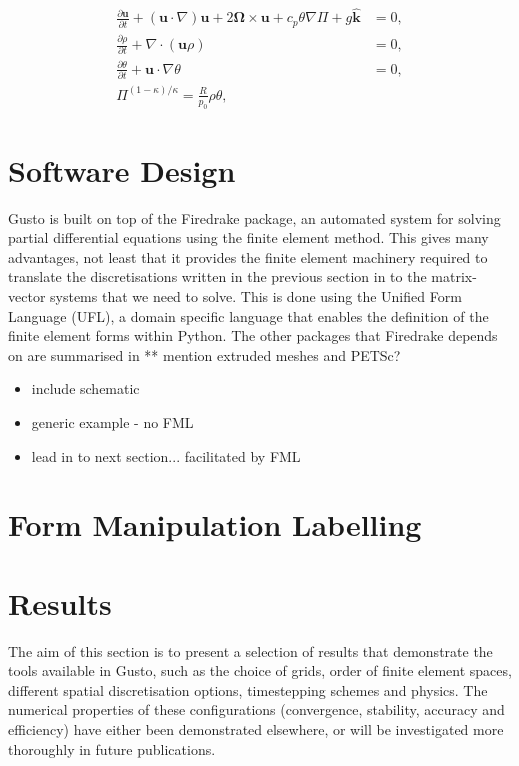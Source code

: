 \documentclass[11pt, a4paper]{article}
\def\MM#1{\boldsymbol{#1}}
\newcommand{\pp}[2]{\frac{\partial #1}{\partial #2}}
\begin{document}
\begin{align}
  \pp{\MM{u}}{t} + 
  (\MM{u}\cdot\nabla)\MM{u} +
  2\MM{\Omega}\times \MM{u} + c_p\theta\nabla \Pi + g\hat{\MM{k}} & = 0, \\
  \pp{\rho}{t} + \nabla\cdot(\MM{u}\rho) & = 0, \\
  \pp{\theta}{t} + \MM{u}\cdot\nabla\theta & = 0, \\
  \Pi^{(1-\kappa)/\kappa} = \frac{R}{p_0}\rho\theta, & 
\end{align}

\subsection{}

\section{Software Design}
\label{sec: design}
Gusto is built on top of the Firedrake package, an automated system
for solving partial differential equations using the finite element
method. This gives many advantages, not least that it provides the
finite element machinery required to translate the discretisations
written in the previous section in to the matrix-vector systems that
we need to solve. This is done using the Unified Form Language (UFL),
a domain specific language that enables the definition of the finite
element forms within Python. The other packages that Firedrake depends
on are summarised in \citet{davies2022towards} ** mention extruded
meshes and PETSc?



\begin{itemize}
\item include schematic
\item generic example - no FML
\item lead in to next section... facilitated by FML
\end{itemize}

\section{Form Manipulation Labelling}
\label{sec: FML}

\section{Results}
\label{sec: results}
The aim of this section is to present a selection of results that
demonstrate the tools available in Gusto, such as the choice of grids,
order of finite element spaces, different spatial discretisation
options, timestepping schemes and physics. The numerical properties of
these configurations (convergence, stability, accuracy and efficiency)
have either been demonstrated elsewhere, or will be investigated more
thoroughly in future publications.
\end{document}
